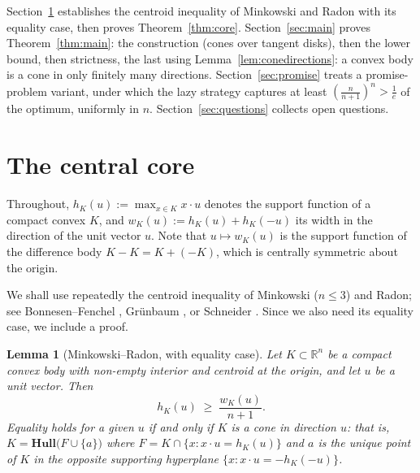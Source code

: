 \documentclass[12pt]{article}
\newtheorem{lemma}[theorem]{Lemma}
\theoremstyle{definition}
\newcommand{\R}{\mathbb{R}}
\newcommand{\Hull}{\mathbf{Hull}}
\begin{document}
Section~\ref{sec:core} establishes the centroid inequality of Minkowski and
Radon with its equality case, then proves Theorem~\ref{thm:core}.
Section~\ref{sec:main} proves Theorem~\ref{thm:main}: the construction
(cones over tangent disks), then the lower bound, then strictness, the last
using
Lemma~\ref{lem:conedirections}: a convex body is a cone in only finitely
many directions.  Section~\ref{sec:promise} treats a promise-problem
variant, under which the lazy strategy captures at least
$\left(\tfrac{n}{n+1}\right)^n > \tfrac1e$ of the optimum, uniformly in
$n$.  Section~\ref{sec:questions} collects open questions.

\section{The central core}\label{sec:core}

Throughout, $h_K(u):=\max_{x\in K} x\cdot u$ denotes the support function
of a compact convex $K$, and $w_K(u):=h_K(u)+h_K(-u)$ its width in the
direction of the unit vector $u$.  Note that $u\mapsto w_K(u)$ is the
support function of the difference body $K-K = K + (-K)$, which is
centrally symmetric about the origin.

We shall use repeatedly the centroid inequality of Minkowski ($n\le 3$)
and Radon; see Bonnesen--Fenchel \cite[\S 34]{bonnesenfenchel},
Gr\"unbaum \cite{grunbaumsurvey}, or Schneider \cite{schneider}.  Since
we also need its equality case, we include a proof.

\begin{lemma}[Minkowski--Radon, with equality case]\label{lem:mr}
Let $K\subset\R^n$ be a compact convex body with non-empty interior and
centroid at the origin, and let $u$ be a unit vector.  Then
\[
h_K(u) \;\ge\; \frac{w_K(u)}{n+1}.
\]
Equality holds for a given $u$ if and only if $K$ is a {\em cone in
direction $u$}: that is, $K=\Hull\bigl(F\cup\{a\}\bigr)$ where
$F = K\cap\{x : x\cdot u = h_K(u)\}$ and $a$ is the unique point of $K$
in the opposite supporting hyperplane $\{x : x\cdot u = -h_K(-u)\}$.
\end{lemma}
\end{document}
